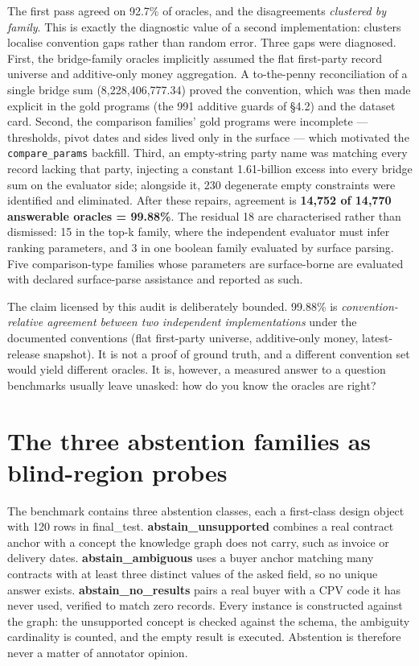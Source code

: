 The first pass agreed on 92.7\% of oracles, and the disagreements \emph{clustered by family}. This is exactly the diagnostic value of a second implementation: clusters localise convention gaps rather than random error. Three gaps were diagnosed. First, the bridge-family oracles implicitly assumed the flat first-party record universe and additive-only money aggregation. A to-the-penny reconciliation of a single bridge sum (8,228,406,777.34) proved the convention, which was then made explicit in the gold programs (the 991 additive guards of §4.2) and the dataset card. Second, the comparison families' gold programs were incomplete --- thresholds, pivot dates and sides lived only in the surface --- which motivated the \texttt{compare\_params} backfill. Third, an empty-string party name was matching every record lacking that party, injecting a constant 1.61-billion excess into every bridge sum on the evaluator side; alongside it, 230 degenerate empty constraints were identified and eliminated. After these repairs, agreement is \textbf{14,752 of 14,770 answerable oracles = 99.88\%}. The residual 18 are characterised rather than dismissed: 15 in the top-k family, where the independent evaluator must infer ranking parameters, and 3 in one boolean family evaluated by surface parsing. Five comparison-type families whose parameters are surface-borne are evaluated with declared surface-parse assistance and reported as such.

The claim licensed by this audit is deliberately bounded. 99.88\% is \emph{convention-relative agreement between two independent implementations} under the documented conventions (flat first-party universe, additive-only money, latest-release snapshot). It is not a proof of ground truth, and a different convention set would yield different oracles. It is, however, a measured answer to a question benchmarks usually leave unasked: how do you know the oracles are right?

\section{The three abstention families as blind-region probes}\label{sec:the-three-abstention-families-as-blind-r}

The benchmark contains three abstention classes, each a first-class design object with 120 rows in final\_test. \textbf{abstain\_unsupported} combines a real contract anchor with a concept the knowledge graph does not carry, such as invoice or delivery dates. \textbf{abstain\_ambiguous} uses a buyer anchor matching many contracts with at least three distinct values of the asked field, so no unique answer exists. \textbf{abstain\_no\_results} pairs a real buyer with a CPV code it has never used, verified to match zero records. Every instance is constructed against the graph: the unsupported concept is checked against the schema, the ambiguity cardinality is counted, and the empty result is executed. Abstention is therefore never a matter of annotator opinion.

